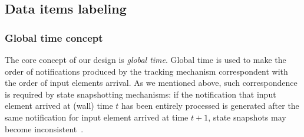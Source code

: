 
\subsection{Data items labeling} \label{labeling}

\subsubsection{Global time concept} \label{fs-acker-gt}
The core concept of our design is \textit{global time}. Global time is used to make the order of notifications produced by the tracking mechanism correspondent with the order of input elements arrival. As we mentioned above, such correspondence is required by state snapshotting mechanisms: if the notification that input element arrived at (wall) time $t$ has been entirely processed is generated after the same notification for input element arrived at time $t+1$, state snapshots may become inconsistent~\cite{2015arXiv150608603C}.

